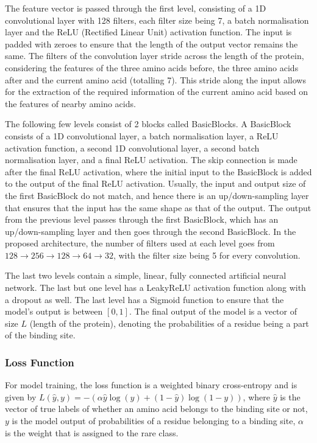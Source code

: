 \documentclass[journal=jcisd8,manuscript=article]{achemso}
\begin{document}
The feature vector is passed through the first level, consisting of a 1D convolutional layer with 128 filters, each filter size being 7, a batch normalisation layer and the ReLU (Rectified Linear Unit) activation function. The input is padded with zeroes to ensure that the length of the output vector remains the same. The filters of the convolution layer stride across the length of the protein, considering the features of the three amino acids before, the three amino acids after and the current amino acid (totalling 7). This stride along the input allows for the extraction of the required information of the current amino acid based on the features of nearby amino acids.

The following few levels consist of 2 blocks called BasicBlocks. A BasicBlock consists of a 1D convolutional layer, a batch normalisation layer, a ReLU activation function, a second 1D convolutional layer, a second batch normalisation layer, and a final ReLU activation. The skip connection is made after the final ReLU activation, where the initial input to the BasicBlock is added to the output of the final ReLU activation. Usually, the input and output size of the first BasicBlock do not match, and hence there is an up/down-sampling layer that ensures that the input has the same shape as that of the output. The output from the previous level passes through the first BasicBlock, which has an up/down-sampling layer and then goes through the second BasicBlock. In the proposed architecture, the number of filters used at each level goes from $128 \to 256 \to 128 \to 64 \to 32$, with the filter size being 5 for every convolution.

The last two levels contain a simple, linear, fully connected artificial neural network. The last but one level has a LeakyReLU activation function along with a dropout as well. The last level has a Sigmoid function to ensure that the model's output is between $[0, 1]$. The final output of the model is a vector of size $L$ (length of the protein), denoting the probabilities of a residue being a part of the binding site.

\subsubsection{Loss Function}
\quad For model training, the loss function is a weighted binary cross-entropy and is given by
$L(\hat{y}, y) = -(\alpha\hat{y}\log(y) + (1-\hat{y})\log(1-y))$, where $\hat{y}$ is the vector of true labels of whether an amino acid belongs to the binding site or not, $y$ is the model output of probabilities of a residue belonging to a binding site, $\alpha$ is the weight that is assigned to the rare class.
\end{document}
